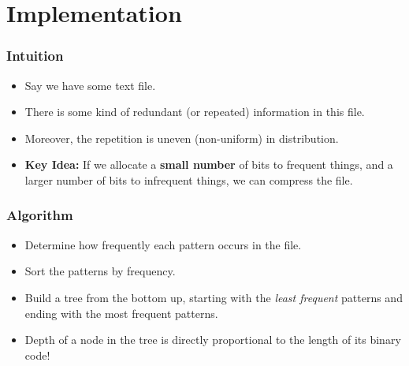 \documentclass[table]{beamer}
\begin{document}
    \section{Implementation}
    \begin{frame}
        \frametitle{Intuition}
        \begin{itemize}
            \item<2-> Say we have some text file.
            \item<3-> There is some kind of redundant (or repeated)
            information in this file.
            \item<4-> Moreover, the repetition is uneven (non-uniform) in
            distribution.
            \item<5-> \textbf{Key Idea:} If we allocate a \textbf{small
            number} of bits to frequent things, and a larger number of bits
            to infrequent things, we can compress the file.
        \end{itemize}
    \end{frame}

    \begin{frame}
        \frametitle{Algorithm}
        \begin{itemize}
            \item<2-> Determine how frequently each pattern occurs in the
            file.
            \item<3-> Sort the patterns by frequency.
            \item<4-> Build a tree from the bottom up, starting with the
            \emph{least frequent} patterns and ending with the most
            frequent patterns.
            \item<5-> Depth of a node in the tree is directly proportional
            to the length of its binary code!
        \end{itemize}
    \end{frame}
\end{document}
